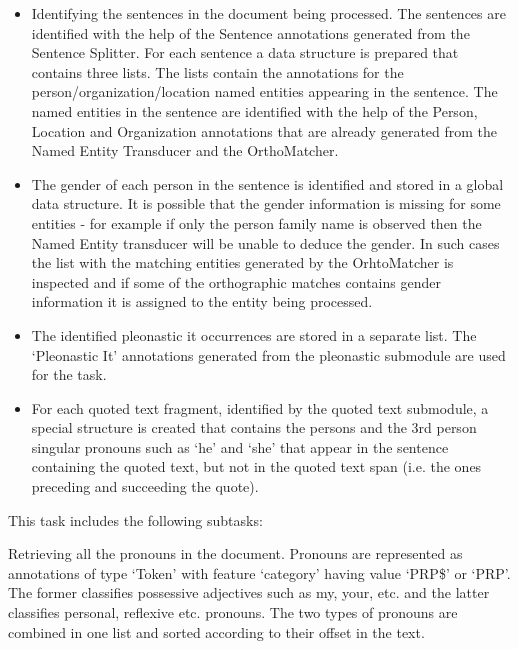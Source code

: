 \begin{itemize}
%
\item
%
Identifying the sentences in the document being processed. The
sentences are identified with the help of the Sentence annotations
generated from the Sentence Splitter.  For each sentence a data
structure is prepared that contains three lists. The lists contain the
annotations for the person/organization/location named entities
appearing in the sentence. The named entities in the sentence are
identified with the help of the Person, Location and Organization
annotations that are already generated from the Named Entity
Transducer and the OrthoMatcher.

\item The gender of each person in the sentence is identified and stored in
a global data structure. It is possible that the gender information is
missing for some entities - for example if only the person family name
is observed then the Named Entity transducer will be unable to deduce
the gender. In such cases the list with the matching entities
generated by the OrhtoMatcher is inspected and if some of the
orthographic matches contains gender information it is assigned to the
entity being processed.

\item The identified pleonastic it occurrences are stored in a
separate list. The `Pleonastic It' annotations generated from the
pleonastic submodule are used for the task.


\item For each quoted text fragment, identified by the quoted text
submodule, a special structure is created that contains the persons
and the 3rd person singular pronouns such as `he' and `she' that
appear in the sentence containing the quoted text, but not in the
quoted text span (i.e. the ones preceding and succeeding the quote).

\end{itemize}


This task includes the following subtasks:

Retrieving all the pronouns in the document. Pronouns are represented
as annotations of type `Token' with feature `category' having value
`PRP\$' or `PRP'. The former classifies possessive adjectives such as
my, your, etc.  and the latter classifies personal, reflexive
etc. pronouns. The two types of pronouns are combined in one list and
sorted according to their offset in the text.


